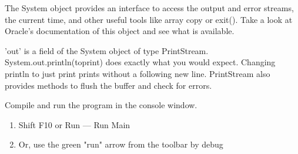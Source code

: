 \documentclass[../../main.tex]{subfiles}
\begin{document}
\begin{steps}
   \item The System object provides an interface to access the output and error streams, the current time, and other useful tools like array copy or exit(). Take a look at Oracle's documentation of this object and see what is available.

   \item 'out' is a field of the System object of type PrintStream. System.out.println(to\textunderscore print) does exactly what you would expect. Changing println to just print prints without a following new line. PrintStream also provides methods to flush the buffer and check for errors.
   \item Compile and run the program in the console window.
   \begin{enumerate}[label=\Alph*.]
   \item Shift F10 or Run --- Run Main
   \item Or, use the green "run" arrow from the toolbar by debug
   \end{enumerate}
\end{steps}
\end{document}
